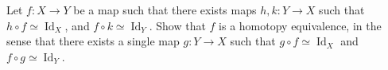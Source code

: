 \documentclass{article}
\newenvironment{problem}[2][Problem]{\begin{trivlist}
\item[\hskip \labelsep {\bfseries #1}\hskip \labelsep {\bfseries #2.}]}{\end{trivlist}}
\newenvironment{solution}[1][Solution.]{\begin{trivlist}
\item[\hskip \labelsep {\bfseries #1}]}{\end{trivlist}}
\begin{document}
\begin{solution} \text{} \\
\end{solution}
\pagebreak
\begin{problem}{3} \text{} \\
  Let $f\colon X\rightarrow Y$ be a map such that there exists maps
  $h,k\colon Y \rightarrow X$ such that $h\circ f \simeq \operatorname{Id}_X$,
  and $f \circ k \simeq \operatorname{Id}_Y$. Show that $f$ is a homotopy
  equivalence, in the sense that there exists a single map
  $g\colon Y \rightarrow X$ such that
  $g \circ f \simeq \operatorname{Id}_X$ and
  $f \circ g \simeq \operatorname{Id}_Y$.
\end{problem}

\begin{solution} \text{} \\
\end{solution}
\end{document}
